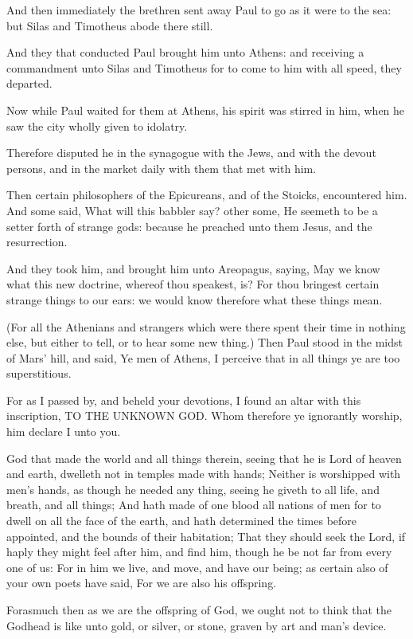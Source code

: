 \verse And then immediately the brethren sent away Paul to go as it were to the sea: but Silas and Timotheus abode there still.

\verse And they that conducted Paul brought him unto Athens: and receiving a commandment unto Silas and Timotheus for to come to him with all speed, they departed.

\verse Now while Paul waited for them at Athens, his spirit was stirred in him, when he saw the city wholly given to idolatry.

\verse Therefore disputed he in the synagogue with the Jews, and with the devout persons, and in the market daily with them that met with him.

\verse Then certain philosophers of the Epicureans, and of the Stoicks, encountered him. And some said, What will this babbler say? other some, He seemeth to be a setter forth of strange gods: because he preached unto them Jesus, and the resurrection.

\verse And they took him, and brought him unto Areopagus, saying, May we know what this new doctrine, whereof thou speakest, is?  \verse For thou bringest certain strange things to our ears: we would know therefore what these things mean.

\verse (For all the Athenians and strangers which were there spent their time in nothing else, but either to tell, or to hear some new thing.)  \verse Then Paul stood in the midst of Mars' hill, and said, Ye men of Athens, I perceive that in all things ye are too superstitious.

\verse For as I passed by, and beheld your devotions, I found an altar with this inscription, TO THE UNKNOWN GOD. Whom therefore ye ignorantly worship, him declare I unto you.

\verse God that made the world and all things therein, seeing that he is Lord of heaven and earth, dwelleth not in temples made with hands; \verse Neither is worshipped with men's hands, as though he needed any thing, seeing he giveth to all life, and breath, and all things; \verse And hath made of one blood all nations of men for to dwell on all the face of the earth, and hath determined the times before appointed, and the bounds of their habitation; \verse That they should seek the Lord, if haply they might feel after him, and find him, though he be not far from every one of us: \verse For in him we live, and move, and have our being; as certain also of your own poets have said, For we are also his offspring.

\verse Forasmuch then as we are the offspring of God, we ought not to think that the Godhead is like unto gold, or silver, or stone, graven by art and man's device.


